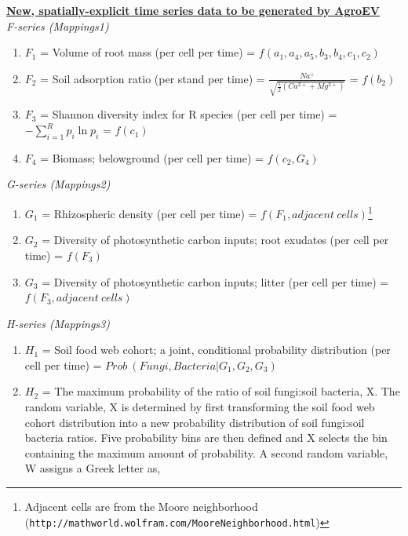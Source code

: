 \vspace{5 mm}

\noindent \textbf{\underline{New, spatially-explicit time series data to be generated by AgroEV}}\\

\noindent \textit{F-series (Mappings1)}
\begin{enumerate}
  \item $F_1$ = Volume of root mass (per cell per time) = $f(a_1, a_4, a_5, b_3, b_4, c_1, c_2)$
  \item $F_2$ = Soil adsorption ratio (per stand per time) = $ {\frac {Na^{+}}{\sqrt {{\tfrac {1}{2}}({Ca^{2+}+Mg^{2+}})}}}$ = $f(b_2)$
  \item $F_3$ = Shannon diversity index for R species (per cell per time) = $-\sum _{i=1}^{R}p_{i}\ln p_{i}$ = $ f(c_1)$
  \item $F_4$ = Biomass; belowground (per cell per time) = $ f(c_2, G_4) $ 
\end{enumerate}

\noindent \textit{G-series (Mappings2)}
\begin{enumerate}
  \item $G_1$ = Rhizospheric density (per cell per time) = $f(F_1, adjacent \ cells)$\footnote{Adjacent cells are from the Moore neighborhood (\verb!http://mathworld.wolfram.com/MooreNeighborhood.html!)}   
  \item $G_2$ = Diversity of photosynthetic carbon inputs; root exudates (per cell per time) = $f(F_3)$
  \item $G_3$ = Diversity of photosynthetic carbon inputs; litter (per cell per time) = $f(F_3, adjacent \ cells)$
 \end{enumerate}  
  
\noindent \textit{H-series (Mappings3)}
\begin{enumerate}  
  \item $H_1$ = Soil food web cohort; a joint, conditional probability distribution (per cell per time) = $ Prob \ (Fungi, Bacteria | G_1, G_2, G_3)$
  \item $H_2$ = The maximum probability of the ratio of soil fungi:soil bacteria, X. The random variable, X is determined by first transforming the soil food web cohort distribution into a new probability distribution of soil fungi:soil bacteria ratios.  Five probability bins are then defined and X selects the bin containing the maximum amount of probability. A second random variable, W assigns a Greek letter as,  
 \end{enumerate}

